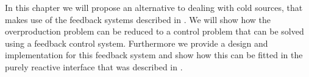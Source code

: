 In this chapter we will propose an alternative to dealing with cold sources, that makes use of the feedback systems described in . We will show how the overproduction problem can be reduced to a control problem that can be solved using a feedback control system. Furthermore we provide a design and implementation for this feedback system and show how this can be fitted in the purely reactive interface that was described in .










